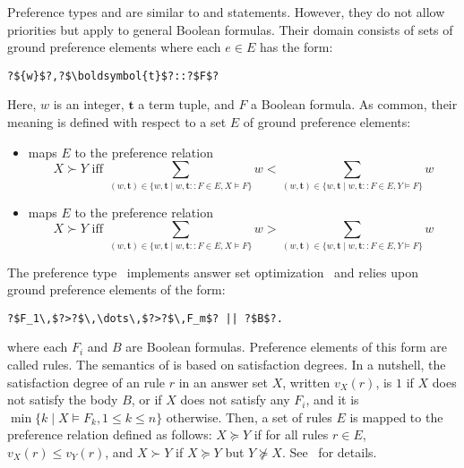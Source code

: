 Preference types  and 
are similar to  and  statements.
However, they do not allow priorities but apply to general Boolean formulas.
Their domain consists of sets of ground preference elements 
 where each $e\in E$ has the form:
\begin{lstlisting}[numbers=none,escapechar=?]
?${w}$?,?$\boldsymbol{t}$?::?$F$?
\end{lstlisting}
Here, ${w}$ is an integer, $\boldsymbol{t}$ a term tuple, and $F$ a Boolean formula. 
%
As common, their meaning is defined with respect to a set $E$ of ground preference elements:
\begin{itemize}
\item
{} maps $E$ to the preference relation
\[
X \succ Y 
\text{ iff }
\sum_{(w,\boldsymbol{t})\in\{w,\boldsymbol{t}\mid w,\boldsymbol{t}\mathtt{::}F\in E, X\models F\}}w
<
\sum_{(w,\boldsymbol{t})\in\{w,\boldsymbol{t}\mid w,\boldsymbol{t}\mathtt{::}F\in E, Y\models F\}}w
\]
\item
{} maps $E$ to the preference relation
\[
X \succ Y 
\text{ iff }
\sum_{(w,\boldsymbol{t})\in\{w,\boldsymbol{t}\mid w,\boldsymbol{t}\mathtt{::}F\in E, X\models F\}}w
>
\sum_{(w,\boldsymbol{t})\in\{w,\boldsymbol{t}\mid w,\boldsymbol{t}\mathtt{::}F\in E, Y\models F\}}w
\]
\end{itemize}

The preference type~ implements answer set optimization~\cite{brnitr03a} and relies upon
ground preference elements of the form:
\begin{lstlisting}[numbers=none,escapechar=?]
?$F_1\,$?>?$\,\dots\,$?>?$\,F_m$? || ?$B$?.
\end{lstlisting}
where each $F_i$ and $B$ are Boolean formulas.
Preference elements of this form are called  rules.  
The semantics of  is based on satisfaction degrees.
In a nutshell,
the satisfaction degree of an  rule $r$ in an answer set $X$, 
written $v_X(r)$, is 
$1$ if $X$ does not satisfy the body $B$, %
or  if $X$ does not satisfy any $F_i$, 
and it is $\min\{k \mid X \models F_k, 1\leq k\leq n\}$ otherwise.
Then, a set of  rules $E$ is mapped to the preference relation defined as follows:
$X \succeq Y$ if for all rules $r \in E$, $v_X(r) \leq v_Y(r)$, 
and $X \succ Y$ if $X \succeq Y$ but $Y \not\succeq X$. 
See~\cite{brnitr03a} for details.

